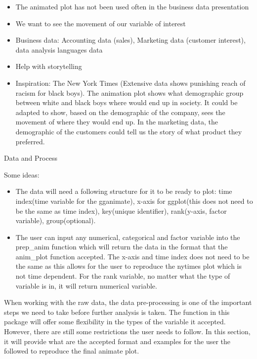 \begin{itemize}
\tightlist
\item
  The animated plot has not been used often in the business data presentation
\item
  We want to see the movement of our variable of interest
\item
  Business data: Accounting data (sales), Marketing data (customer interest), data analysis languages data
\item
  Help with storytelling
\item
  Inspiration: The New York Times (Extensive data shows punishing reach of racism for black boys). The animation plot shows what demographic group between white and black boys where would end up in society. It could be adapted to show, based on the demographic of the company, sees the movement of where they would end up. In the marketing data, the demographic of the customers could tell us the story of what product they preferred.
\end{itemize}

Data and Process

Some ideas:

\begin{itemize}
\item
  The data will need a following structure for it to be ready to plot: time index(time variable for the gganimate), x-axis for ggplot(this does not need to be the same as time index), key(unique identifier), rank(y-axis, factor variable), group(optional).
\item
  The user can input any numerical, categorical and factor variable into the prep\_anim function which will return the data in the format that the anim\_plot function accepted. The x-axis and time index does not need to be the same as this allows for the user to reproduce the nytimes plot which is not time dependent. For the rank variable, no matter what the type of variable is in, it will return numerical variable.
\end{itemize}

When working with the raw data, the data pre-processing is one of the important steps we need to take before further analysis is taken. The function in this package will offer some flexibility in the types of the variable it accepted. However, there are still some restrictions the user needs to follow. In this section, it will provide what are the accepted format and examples for the user the followed to reproduce the final animate plot.

